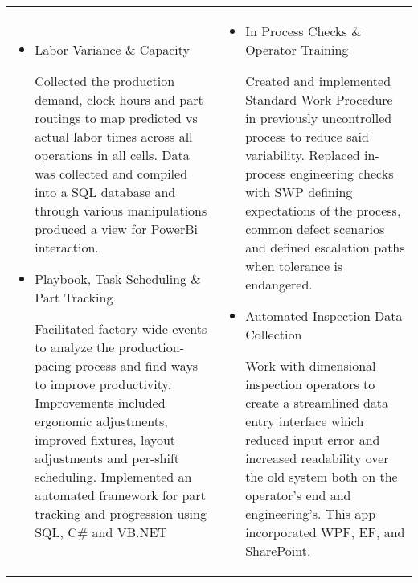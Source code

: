 \documentclass[a4paper, oneside, final, fontsize=9pt, usegeometry]{scrartcl} %
\newcommand{\Csharp}{C{\lserif\#}}
\begin{document}
\begin{center}
	\begin{tabularx}{0.97\linewidth}{X|X}
		\vspace{-10pt}
		\begin{itemize}\setlength\itemsep{0em}
			\item{Labor Variance \&{} Capacity}
			\begin{sloppypar}
				Collected the production demand, clock hours and part routings to map predicted vs actual labor times across all operations in all cells.
				Data was collected and compiled into a SQL database and through various manipulations produced a view for PowerBi interaction.
			\end{sloppypar}
			\item{Playbook, Task Scheduling \&{} Part Tracking}
			\begin{sloppypar}
				Facilitated factory-wide events to analyze the production-pacing process and find ways to improve productivity.
				Improvements included ergonomic adjustments, improved fixtures, layout adjustments and per-shift scheduling.
				Implemented an automated framework for part tracking and progression using SQL, \Csharp{} and VB.NET
			\end{sloppypar}
		\end{itemize} & \vspace{-10pt} \begin{itemize}\setlength\itemsep{0em}
			                               \item{In Process Checks \&{} Operator Training}
			                               \begin{sloppypar}
				Created and implemented Standard Work Procedure in previously uncontrolled process to reduce said variability.
				Replaced in-process engineering checks with SWP defining expectations of the process, common defect scenarios
				and defined escalation paths when tolerance is endangered.
			\end{sloppypar}
			                               \item {Automated Inspection Data Collection}
			                                     \begin{sloppypar}
				      Work with dimensional inspection operators to create a streamlined data entry interface which reduced
				      input error and increased readability over the old system both on the operator's end and engineering's. This
				      app incorporated WPF, EF, and SharePoint.
			      \end{sloppypar}
		                               \end{itemize}
	\end{tabularx}


\end{center}
\end{document}
